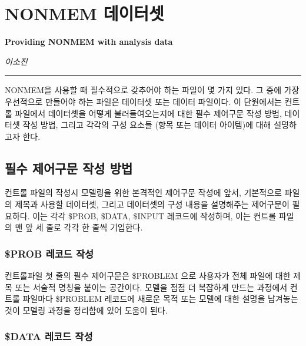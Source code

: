 \documentclass[
  10pt,
]{krantz}
\begin{document}
\hypertarget{nonmem-dataset}{%
\chapter{NONMEM 데이터셋}\label{nonmem-dataset}}

\textbf{Providing NONMEM with analysis data}

\emph{이소진}

\begin{center}\rule{0.5\linewidth}{0.5pt}\end{center}

NONMEM을 사용할 때 필수적으로 갖추어야 하는 파일이 몇 가지 있다. 그 중에 가장 우선적으로 만들어야 하는 파일은 데이터셋 또는 데이터 파일이다. 이 단원에서는 컨트롤 파일에서 데이터셋을 어떻게 불러들여오는지에 대한 필수 제어구문 작성 방법, 데이터셋 작성 방법, 그리고 각각의 구성 요소들 (항목 또는 데이터 아이템)에 대해 설명하고자 한다.

\hypertarget{uxd544uxc218-uxc81cuxc5b4uxad6cuxbb38-uxc791uxc131-uxbc29uxbc95}{%
\section{필수 제어구문 작성 방법}\label{uxd544uxc218-uxc81cuxc5b4uxad6cuxbb38-uxc791uxc131-uxbc29uxbc95}}

컨트롤 파일의 작성시 모델링을 위한 본격적인 제어구문 작성에 앞서, 기본적으로 파일의 제목과 사용할 데이터셋, 그리고 데이터셋의 구성 내용을 설명해주는 제어구문이 필요하다. 이는 각각 \$PROB, \$DATA, \$INPUT 레코드에 작성하며, 이는 컨트롤 파일의 맨 앞 세 줄로 각각 한 줄씩 기입한다.

\hypertarget{prob-uxb808uxcf54uxb4dc-uxc791uxc131}{%
\subsection{\$PROB 레코드 작성}\label{prob-uxb808uxcf54uxb4dc-uxc791uxc131}}

컨트롤파일 첫 줄의 필수 제어구문은 \$PROBLEM 으로 사용자가 전체 파일에 대한 제목 또는 서술적 명칭을 붙이는 공간이다. 모델을 점점 더 복잡하게 만드는 과정에서 컨트롤 파일마다 \$PROBLEM 레코드에 새로운 목적 또는 모델에 대한 설명을 남겨놓는 것이 모델링 과정을 정리함에 있어 도움이 된다.

\hypertarget{data-uxb808uxcf54uxb4dc-uxc791uxc131}{%
\subsection{\$DATA 레코드 작성}\label{data-uxb808uxcf54uxb4dc-uxc791uxc131}}
\end{document}
